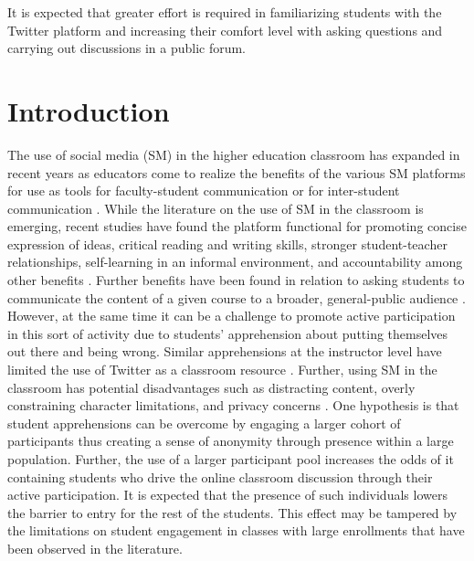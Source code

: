 \documentclass[12pt]{article}
\begin{document}
It is expected that greater effort is required in familiarizing students with the Twitter platform and increasing their comfort level with asking questions and carrying out discussions in a public forum.



\section*{Introduction}

The use of social media (SM) in the higher education classroom has expanded in recent years as educators come to realize the benefits of the various SM platforms for use as tools for faculty-student communication or for inter-student communication \cite{blessing_using_2012}. While the literature on the use of SM in the classroom is emerging, recent studies have found the platform functional for promoting concise expression of ideas, critical reading and writing skills, stronger student-teacher relationships, self-learning in an informal environment, and accountability among other benefits \cite{shiffman_twitter_2012}. Further benefits have been found in relation to asking students to communicate the content of a given course to a broader, general-public audience \cite{junco_effect_2011, ha_influence_2013}. However, at the same time it can be a challenge to promote active participation in this sort of activity due to students’ apprehension about putting themselves out there and being wrong. Similar apprehensions at the instructor level have limited the use of Twitter as a classroom resource \cite{carpenter_how_2014}. Further, using SM in the classroom has potential disadvantages such as distracting content, overly constraining character limitations, and privacy concerns \cite{dhir_tweeters_2013}. One hypothesis is that student apprehensions can be overcome by engaging a larger cohort of participants thus creating a sense of anonymity through presence within a large population. Further, the use of a larger participant pool increases the odds of it containing students who drive the online classroom discussion through their active participation. It is expected that the presence of such individuals lowers the barrier to entry for the rest of the students. This effect may be tampered by the limitations on student engagement in classes with large enrollments that have been observed in the literature. \cite{ahlfeldt_measurement_2005}
\end{document}
